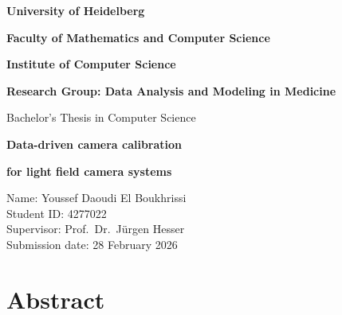 \documentclass[12pt]{scrartcl}
\begin{document}
\begin{titlepage}
\thispagestyle{empty}

\begin{center}
    \vspace*{2.5cm}

    {\large \textbf{University of Heidelberg}\par}
    \vspace{0.3cm}
    {\large \textbf{Faculty of Mathematics and Computer Science}\par}
    \vspace{0.15cm}
    {\large \textbf{Institute of Computer Science}\par}
    \vspace{0.15cm}
    {\large \textbf{Research Group: Data Analysis and Modeling in Medicine}\par}

    \vspace{2.2cm}

    {\large Bachelor's Thesis in Computer Science\par}

    \vspace{2.4cm}

    {\LARGE\bfseries Data-driven camera calibration\par}
    \vspace{0.3cm}
    {\LARGE\bfseries for light field camera systems\par}
\end{center}

\vfill
\begin{flushleft}
Name: Youssef Daoudi El Boukhrissi\\
Student ID: 4277022\\
Supervisor: Prof.\ Dr.\ Jürgen Hesser\\
Submission date: 28 February 2026
\end{flushleft}

\end{titlepage}

%



\section*{Abstract}
\end{document}
